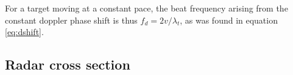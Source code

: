 For a target moving at a constant pace, the beat frequency arising from the constant doppler phase shift is thus $f_d = 2v/\lambda_t$, as was found in equation \ref{eq:dshift}. 


\subsection{Radar cross section}












